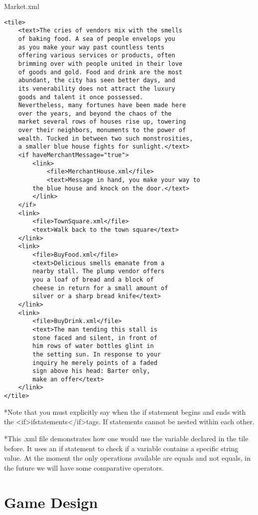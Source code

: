 \documentclass[11pt]{article}
\begin{document}
Market.xml
\begin{lstlisting}[frame=single]
<tile>
	<text>The cries of vendors mix with the smells 
	of baking food. A sea of people envelops you 
	as you make your way past countless tents 
	offering various services or products, often 
	brimming over with people united in their love 
	of goods and gold. Food and drink are the most 
	abundant, the city has seen better days, and 
	its venerability does not attract the luxury 
	goods and talent it once possessed. 
	Nevertheless, many fortunes have been made here 
	over the years, and beyond the chaos of the 
	market several rows of houses rise up, towering 
	over their neighbors, monuments to the power of 
	wealth. Tucked in between two such monstrosities, 
	a smaller blue house fights for sunlight.</text>
	<if haveMerchantMessage="true">
        <link>
            <file>MerchantHouse.xml</file>
            <text>Message in hand, you make your way to 
		the blue house and knock on the door.</text>
        </link>
    </if>
    <link>
		<file>TownSquare.xml</file>
		<text>Walk back to the town square</text>
	</link>
	<link>
		<file>BuyFood.xml</file>
		<text>Delicious smells emanate from a 
		nearby stall. The plump vendor offers 
		you a loaf of bread and a block of 
		cheese in return for a small amount of 
		silver or a sharp bread knife</text>
	</link>
	<link>
		<file>BuyDrink.xml</file>
		<text>The man tending this stall is 
		stone faced and silent, in front of 
		him rows of water bottles glint in 
		the setting sun. In response to your 
		inquiry he merely points of a faded 
		sign above his head: Barter only, 
		make an offer</text>
	</link>
</tile>
\end{lstlisting}
*Note that you must explicitly say when the if statement begins and ends with the \textless if\textgreater ifstatements\textless /if\textgreater tags. If statements cannot be nested within each other. 

*This .xml file demonstrates how one would use the variable declared in the tile before. It uses an if statement to check if a variable contains a specific string value. At the moment the only operations available are equals and not equals, in the future we will have some comparative operators.


\section{Game Design}
\end{document}
